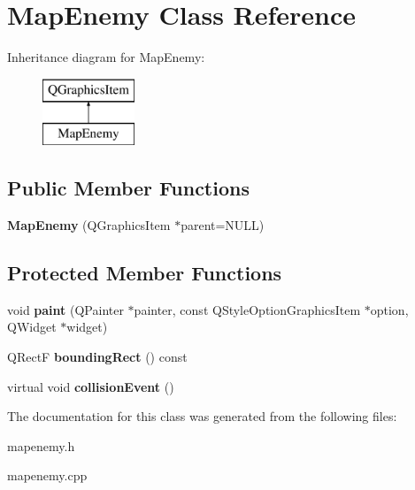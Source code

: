 \hypertarget{class_map_enemy}{\section{Map\-Enemy Class Reference}
\label{class_map_enemy}
}
Inheritance diagram for Map\-Enemy\-:\begin{figure}[H]
\begin{center}
\leavevmode
\includegraphics[height=2.000000cm]{class_map_enemy}
\end{center}
\end{figure}
\subsection*{Public Member Functions}
\begin{DoxyCompactItemize}
\item 
\hypertarget{class_map_enemy_a0ec0658d11120c1618bdd39fae1c8f30}{{\bfseries Map\-Enemy} (Q\-Graphics\-Item $\ast$parent=N\-U\-L\-L)}\label{class_map_enemy_a0ec0658d11120c1618bdd39fae1c8f30}

\end{DoxyCompactItemize}
\subsection*{Protected Member Functions}
\begin{DoxyCompactItemize}
\item 
\hypertarget{class_map_enemy_a824c6d66bce423f3e89fe4111a9cf2f0}{void {\bfseries paint} (Q\-Painter $\ast$painter, const Q\-Style\-Option\-Graphics\-Item $\ast$option, Q\-Widget $\ast$widget)}\label{class_map_enemy_a824c6d66bce423f3e89fe4111a9cf2f0}

\item 
\hypertarget{class_map_enemy_ae8847f947b045ae9fd3c1fd7ccb522fc}{Q\-Rect\-F {\bfseries bounding\-Rect} () const }\label{class_map_enemy_ae8847f947b045ae9fd3c1fd7ccb522fc}

\item 
\hypertarget{class_map_enemy_a8b41e9638d4c20b9480b6e1130510bf8}{virtual void {\bfseries collision\-Event} ()}\label{class_map_enemy_a8b41e9638d4c20b9480b6e1130510bf8}

\end{DoxyCompactItemize}


The documentation for this class was generated from the following files\-:\begin{DoxyCompactItemize}
\item 
mapenemy.\-h\item 
mapenemy.\-cpp\end{DoxyCompactItemize}
